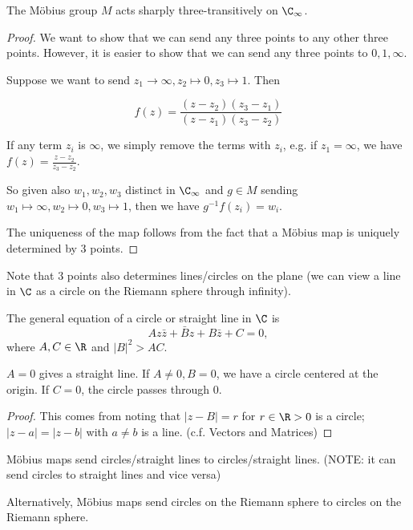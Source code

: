 \documentclass[a4paper]{article}
\begin{document}
  \begin{prop}
    The M\"obius group $M$ acts sharply three-transitively on $\C_\infty$.
  \end{prop}

  \begin{proof}
    We want to show that we can send any three points to any other three points. However, it is easier to show that we can send any three points to $0, 1, \infty$. 

    Suppose we want to send $z_1\to \infty, z_2\mapsto 0, z_3 \mapsto 1$. Then

    \[
      f(z) = \frac{(z - z_2)(z_3 - z_1)}{(z - z_1)(z_3 - z_2)}
    \]

    If any term $z_i$ is $\infty$, we simply remove the terms with $z_i$, e.g. if $z_1 = \infty$, we have $f(z) = \frac{z - z_2}{z_3 - z_2}$.

    So given also $w_1, w_2, w_3$ distinct in $\C_\infty$ and $g\in M$ sending $w_1\mapsto \infty, w_2\mapsto 0, w_3\mapsto 1$, then we have $g^{-1}f(z_i) = w_i$.

    The uniqueness of the map follows from the fact that a M\"obius map is uniquely determined by 3 points.
  \end{proof}

  Note that 3 points also determines lines/circles on the plane (we can view a line in $\C$ as a circle on the Riemann sphere through infinity).

  \begin{lemma}
    The general equation of a circle or straight line in $\C$ is
    \[
      Az\bar z + \bar Bz + B\bar z + C = 0,
    \]
    where $A, C\in \R$ and $|B|^2 > AC$.
  \end{lemma}
  \note $A = 0$ gives a straight line. If $A \not= 0, B = 0$, we have a circle centered at the origin. If $C = 0$, the circle passes through 0.

  \begin{proof}
    This comes from noting that $|z - B| = r$ for $r \in \R> 0$ is a circle; $|z - a| = |z - b|$ with $a\not= b $ is a line. (c.f. Vectors and Matrices)
  \end{proof}

  \begin{prop}
    M\"obius maps send circles/straight lines to circles/straight lines. (NOTE: it can send circles to straight lines and vice versa)

    Alternatively, M\"obius maps send circles on the Riemann sphere to circles on the Riemann sphere.
  \end{prop}
\end{document}
